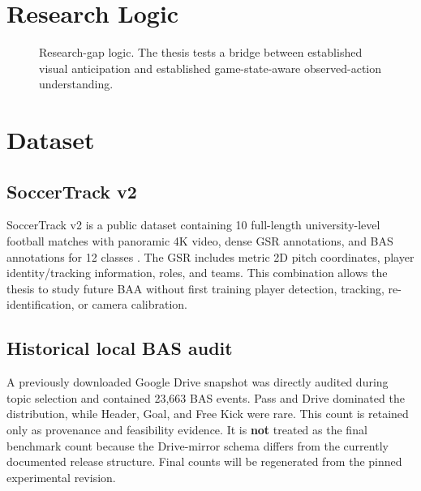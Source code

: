 \documentclass[11pt,a4paper]{article}
\begin{document}
\section{Research Logic}
\begin{figure}[H]
\centering
{}
\caption{Research-gap logic. The thesis tests a bridge between established visual anticipation and established game-state-aware observed-action understanding.}
\end{figure}

\section{Dataset}
\subsection{SoccerTrack v2}
SoccerTrack v2 is a public dataset containing 10 full-length university-level football matches with panoramic 4K video, dense GSR annotations, and BAS annotations for 12 classes \citep{scott2025soccertrack,soccertrackrepo2026}. The GSR includes metric 2D pitch coordinates, player identity/tracking information, roles, and teams. This combination allows the thesis to study future BAA without first training player detection, tracking, re-identification, or camera calibration.

\subsection{Historical local BAS audit}
A previously downloaded Google Drive snapshot was directly audited during topic selection and contained 23,663 BAS events. Pass and Drive dominated the distribution, while Header, Goal, and Free Kick were rare. This count is retained only as provenance and feasibility evidence. It is \textbf{not} treated as the final benchmark count because the Drive-mirror schema differs from the currently documented release structure. Final counts will be regenerated from the pinned experimental revision.
\end{document}
